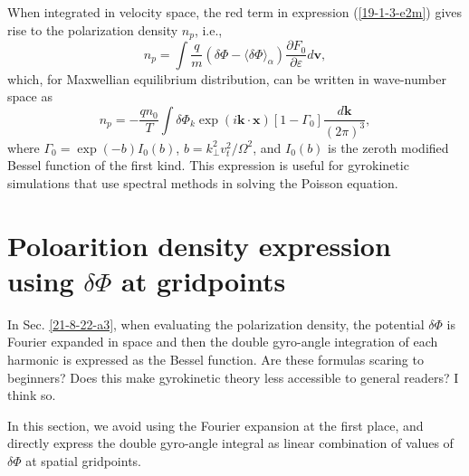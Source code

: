 \documentclass{llncs}
\begin{document}
When integrated in velocity space, the red term in expression
(\ref{19-1-3-e2m}) gives rise to the polarization density $n_p$, i.e.,
\begin{equation}
  n_p = \int \frac{q}{m} (\delta \Phi - \langle \delta \Phi \rangle_{\alpha})
  \frac{\partial F_0}{\partial \varepsilon} d\mathbf{v},
\end{equation}
which, for Maxwellian equilibrium distribution, can be written in wave-number
space as
\begin{equation}
  n_p = - \frac{q n_0}{T} \int \delta \Phi_k \exp (i\mathbf{k} \cdot
  \mathbf{x}) [1 - \Gamma_0] \frac{d\mathbf{k}}{(2 \pi)^3},
\end{equation}
where $\Gamma_0 = \exp (- b) I_0 (b)$, $b = k_{\perp}^2 v_t^2 / \Omega^2$, and
$I_0 (b)$ is the zeroth modified Bessel function of the first kind. This
expression is useful for gyrokinetic simulations that use spectral methods in
solving the Poisson equation.

\appendix\section{Poloarition density expression using $\delta \Phi$ at
gridpoints }

In Sec. \ref{21-8-22-a3}, when evaluating the polarization density, the
potential $\delta \Phi$ is Fourier expanded in space and then the double
gyro-angle integration of each harmonic is expressed as the Bessel function.
Are these formulas scaring to beginners? Does this make gyrokinetic theory
less accessible to general readers? I think so.

In this section, we avoid using the Fourier expansion at the first place, and
directly express the double gyro-angle integral as linear combination of
values of $\delta \Phi$ at spatial gridpoints.
\end{document}

